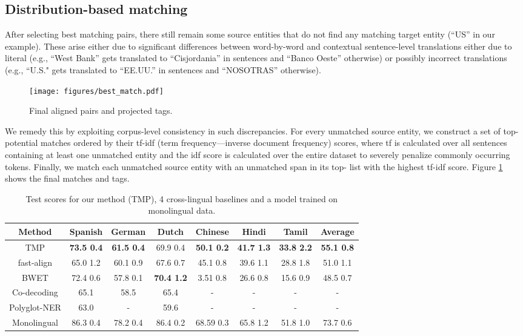 \documentclass[11pt,a4paper]{article}
\begin{document}
\subsection{Distribution-based matching}
After selecting best matching pairs, 
there still remain some source entities 
that do not find any matching target entity (``US'' in our example). 
These arise either due to significant differences between word-by-word 
and contextual sentence-level translations either due to literal
(e.g., ``West Bank'' gets translated to ``Cisjordania''
in sentences and ``Banco Oeste'' otherwise) 
or possibly incorrect translations
(e.g., ``U.S." gets translated to  ``EE.UU.'' in sentences and ``NOSOTRAS'' otherwise). 

\begin{figure}[htb]
    \centering
    \texttt{[image: figures/best\_match.pdf]}
    \caption{Final aligned pairs and projected tags.}
\label{fig:best-match}
\end{figure}

We remedy this by exploiting corpus-level 
consistency in such discrepancies.
For every unmatched source entity, 
we construct a set of top- potential matches 
ordered by their tf-idf (term frequency---inverse document frequency) scores, 
where tf is calculated over all sentences 
containing at least one unmatched entity 
and the idf score is calculated over the entire dataset 
to severely penalize commonly occurring tokens. 
Finally, we match each unmatched source entity 
with an unmatched span in its top- list with the highest tf-idf score. Figure \ref{fig:best-match} shows the final matches and tags.



\begin{table*}[!h]
\small
\centering
\begin{tabularx}{0.95\textwidth}{cccccccc}
\toprule
\bf Method & \bf Spanish & \bf German & \bf Dutch & \bf Chinese & \bf Hindi & \bf Tamil & \bf Average \\
\toprule
TMP & \bf 73.5  0.4 & \bf 61.5  0.4 & 69.9  0.4 &
\bf 50.1   0.2 &
\bf 41.7   1.3 & \bf 33.8  2.2 & \bf 55.1  0.8 \\
\midrule
fast-align & 65.0  1.2 & 
60.1  0.9 &
67.6  0.7 &
45.1  0.8 &
39.6  1.1 & 
28.8  1.8 & 
51.0  1.1 \\
BWET & 72.4  0.6 & 
57.8  0.1 & \bf 70.4  1.2 &
3.51  0.8 &
26.6  0.8 & 
15.6  0.9 & 
48.5  0.7 \\
Co-decoding & 65.1 & 58.5 & 65.4 & - & - & - & - \\
Polyglot-NER & 63.0 & - & 59.6 & - & - & - & - \\
\midrule
Monolingual & 86.3  0.4 & 78.2  0.4 & 86.4  0.2 & 
68.59  0.3 & 
65.8  1.2 & 51.8  1.0 & 73.7  0.6 \\
\bottomrule
\end{tabularx}
\caption{Test  scores for our method (TMP), 4 cross-lingual baselines and a model trained on monolingual data.}
\label{tab:results}
\end{table*} 
\end{document}
